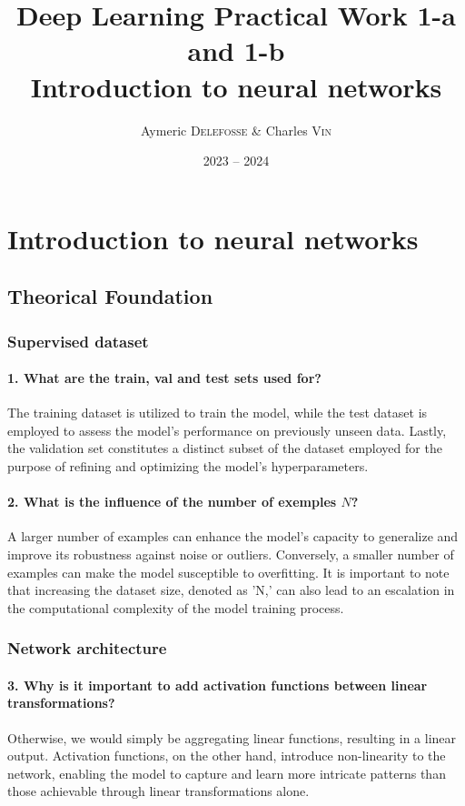 \documentclass{article}
\title{
    Deep Learning Practical Work 1-a and 1-b \\
    \Large \textbf{Introduction to neural networks}
}
\author{Aymeric \textsc{Delefosse} \& Charles \textsc{Vin}}
\date{2023 -- 2024}
\theoremstyle{plain}%
\theoremstyle{definition}
\theoremstyle{remark}
\begin{document}
\maketitle

\section{Introduction to neural networks}
\subsection{Theorical Foundation}
\subsubsection{Supervised dataset}
\paragraph{1. What are the train, val and test sets used for?}
The training dataset is utilized to train the model, while the test dataset is employed to assess the model's performance on previously unseen data. Lastly, the validation set constitutes a distinct subset of the dataset employed for the purpose of refining and optimizing the model's hyperparameters.

\paragraph{2. What is the influence of the number of exemples $N$?}
A larger number of examples can enhance the model's capacity to generalize and improve its robustness against noise or outliers. Conversely, a smaller number of examples can make the model susceptible to overfitting. It is important to note that increasing the dataset size, denoted as 'N,' can also lead to an escalation in the computational complexity of the model training process.

\subsubsection{Network architecture}
\paragraph{3. Why is it important to add activation functions between linear transformations?}
Otherwise, we would simply be aggregating linear functions, resulting in a linear output. Activation functions, on the other hand, introduce non-linearity to the network, enabling the model to capture and learn more intricate patterns than those achievable through linear transformations alone.
\end{document}
